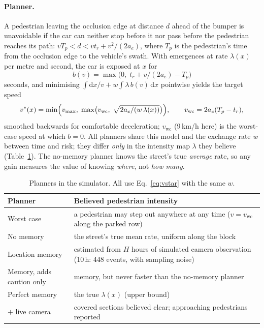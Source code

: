 \documentclass[11pt,a4paper]{article}
\begin{document}
\paragraph{Planner.}
A pedestrian leaving the occlusion edge at distance $d$ ahead of the bumper is unavoidable if the car can neither stop before it nor pass before the pedestrian reaches its path:
$v T_p < d < v t_r + v^2/(2a_e)$, where $T_p$ is the pedestrian's time from the occlusion edge to the vehicle's swath.
With emergences at rate $\lambda(x)$ per metre and second, the car is exposed at $x$ for
\begin{equation}
b(v) = \max\bigl(0,\; t_r + v/(2a_e) - T_p\bigr)
\end{equation}
seconds, and minimising $\int \mathrm{d}x/v + w \int \lambda\, b(v)\, \mathrm{d}x$ pointwise yields the target speed
\begin{equation}
v^\ast(x) = \min\Bigl(v_{\max},\; \max\bigl(v_{\text{wc}},\; \sqrt{2a_e / (w\,\lambda(x))}\bigr)\Bigr), \qquad v_{\text{wc}} = 2a_e (T_p - t_r),
\label{eq:vstar}
\end{equation}
smoothed backwards for comfortable deceleration; $v_{\text{wc}}$ (9\,km/h here) is the worst-case speed at which $b=0$.
All planners share this model and the exchange rate $w$ between time and risk; they differ \emph{only} in the intensity map $\lambda$ they believe (Table~\ref{tab:planners}).
The no-memory planner knows the street's true \emph{average} rate, so any gain measures the value of knowing \emph{where}, not \emph{how many}.

\begin{table}[t]
\centering\small
\caption{Planners in the simulator. All use Eq.~\eqref{eq:vstar} with the same $w$.}
\label{tab:planners}
\begin{tabularx}{\linewidth}{lX}
\toprule
Planner & Believed pedestrian intensity \\
\midrule
Worst case & a pedestrian may step out anywhere at any time ($v=v_{\text{wc}}$ along the parked row) \\
No memory & the street's true mean rate, uniform along the block \\
Location memory & estimated from $H$ hours of simulated camera observation (10\,h: 448 events, with sampling noise) \\
Memory, adds caution only & memory, but never faster than the no-memory planner \\
Perfect memory & the true $\lambda(x)$ (upper bound) \\
$+$ live camera & covered sections believed clear; approaching pedestrians reported \\
\bottomrule
\end{tabularx}
\end{table}
\end{document}
